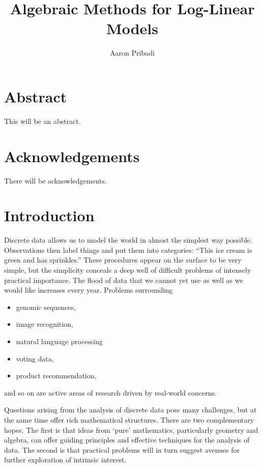 \documentclass[cclicense]{hmcthesis}
\title{Algebraic Methods for Log-Linear Models}
\author{Aaron Pribadi}
\numberwithin{equation}{chapter}
\numberwithin{thmcounter}{chapter}
\begin{document}
\frontmatter

\maketitle

\tableofcontents


\chapter{Abstract}
    This will be an abstract.

\chapter{Acknowledgements}
    There will be acknowledgements.

\mainmatter

\chapter{Introduction}

    Discrete data allows us to model the world in almost the simplest way
    possible.  Observations then label things and put them into categories:
    ``This ice cream is green and has sprinkles.''  These procedures appear on
    the surface to be very simple, but the simplicity conceals a deep well of
    difficult problems of intensely practical importance.  The flood of data
    that we cannot yet use as well as we would like increases every year.
    Problems surrounding
    \begin{itemize}\noparspace
    \item genomic sequences,
    \item image recognition,
    \item natural language processing
    \item voting data,
    \item product recommendation,
    \end{itemize}
    and so on are active areas of research driven by real-world concerns.

    Questions arising from the analysis of discrete data pose many challenges,
    but at the same time offer rich mathematical structures.  There are two
    complementary hopes.  The first is that ideas from `pure' mathematics,
    particularly geometry and algebra, can offer guiding principles and
    effective techniques for the analysis of data.  The second is that practical
    problems will in turn suggest avenues for further exploration of intrinsic
    interest.
\end{document}
